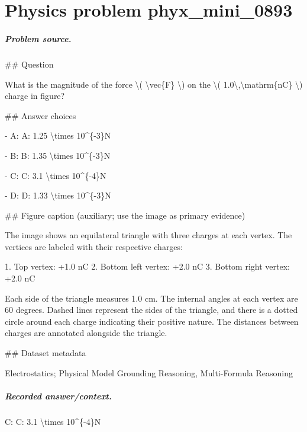 
\chapter{Physics problem phyx\_mini\_0893}
\label{ch:PhyXMiniProblems_problem_phyx_mini_0893}

\paragraph{Problem source.}
\#\# Question

What is the magnitude of the force \textbackslash{}( \textbackslash{}vec\{F\} \textbackslash{}) on the \textbackslash{}( 1.0\textbackslash{},\textbackslash{}mathrm\{nC\} \textbackslash{}) charge in figure?

\#\# Answer choices

- A: A: 1.25 \textbackslash{}times 10\textasciicircum{}\{-3\}N

- B: B: 1.35 \textbackslash{}times 10\textasciicircum{}\{-3\}N

- C: C: 3.1 \textbackslash{}times 10\textasciicircum{}\{-4\}N

- D: D: 1.33 \textbackslash{}times 10\textasciicircum{}\{-3\}N

\#\# Figure caption (auxiliary; use the image as primary evidence)

The image shows an equilateral triangle with three charges at each vertex. The vertices are labeled with their respective charges:

1. Top vertex: +1.0 nC
2. Bottom left vertex: +2.0 nC
3. Bottom right vertex: +2.0 nC

Each side of the triangle measures 1.0 cm. The internal angles at each vertex are 60 degrees. Dashed lines represent the sides of the triangle, and there is a dotted circle around each charge indicating their positive nature. The distances between charges are annotated alongside the triangle.

\#\# Dataset metadata

Electrostatics; Physical Model Grounding Reasoning, Multi-Formula Reasoning

\paragraph{Recorded answer/context.}
C: C: 3.1 \textbackslash{}times 10\textasciicircum{}\{-4\}N

